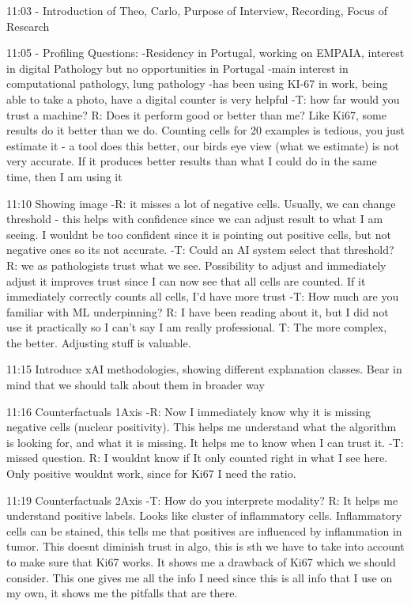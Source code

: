 11:03 - Introduction of Theo, Carlo, Purpose of Interview, Recording, Focus of Research

11:05 - Profiling Questions:
-Residency in Portugal, working on EMPAIA, interest in digital Pathology but no opportunities in Portugal
-main interest in computational pathology, lung pathology
-has been using KI-67 in work, being able to take a photo, have a digital counter is very helpful
-T: how far would you trust a machine? R: Does it perform good or better than me? Like Ki67, some results do it better than we do. Counting cells for 20 examples is tedious, you just estimate it - a tool does this better, our birds eye view (what we estimate) is not very accurate. If it produces better results than what I could do in the same time, then I am using it

11:10 Showing image
-R: it misses a lot of negative cells. Usually, we can change threshold - this helps with confidence since we can adjust result to what I am seeing. I wouldnt be too confident since it is pointing out positive cells, but not negative ones so its not accurate.
-T: Could an AI system select that threshold? R: we as pathologists trust what we see. Possibility to adjust and immediately adjust it improves trust since I can now see that all cells are counted. If it immediately correctly counts all cells, I'd have more trust
-T: How much are you familiar with ML underpinning? R: I have been reading about it, but I did not use it practically so I can't say I am really professional. T: The more complex, the better. Adjusting stuff is valuable.

11:15 Introduce xAI methodologies, showing different explanation classes. Bear in mind that we should talk about them in broader way

11:16 Counterfactuals 1Axis
-R: Now I immediately know why it is missing negative cells (nuclear positivity). This helps me understand what the algorithm is looking for, and what it is missing. It helps me to know when I can trust it.
-T: missed question. R: I wouldnt know if It only counted right in what I see here. Only positive wouldnt work, since for Ki67 I need the ratio.

11:19 Counterfactuals 2Axis
-T: How do you interprete modality? R: It helps me understand positive labels. Looks like cluster of inflammatory cells. Inflammatory cells can be stained, this tells me that positives are influenced by inflammation in tumor. This doesnt diminish trust in algo, this is sth we have to take into account to make sure that Ki67 works. It shows me a drawback of Ki67 which we should consider. This one gives me all the info I need since this is all info that I use on my own, it shows me the pitfalls that are there.

